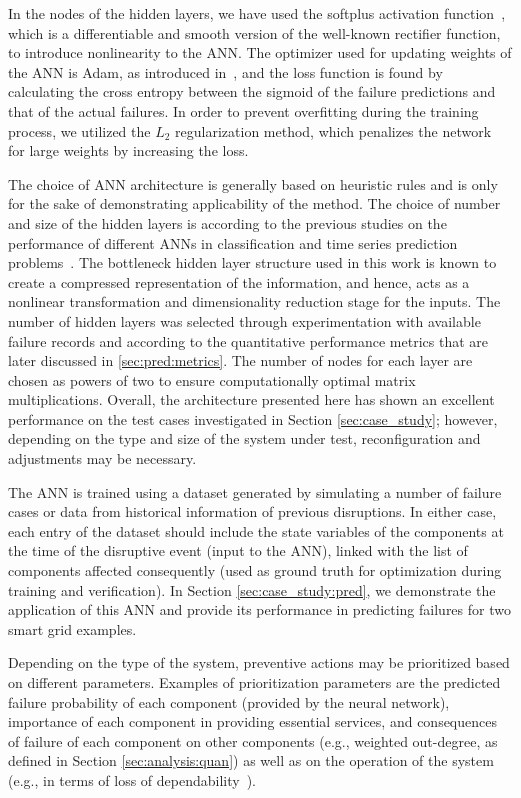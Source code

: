 \documentclass[12pt]{elsarticle}
\begin{document}
In the nodes of the hidden layers, we have used the softplus activation function~\cite{DuB00}, which is a differentiable and smooth version of the well-known rectifier function, to introduce nonlinearity to the ANN. The optimizer used for updating weights of the ANN is Adam, as introduced in~\cite{KiB15}, and the loss function is found by calculating the cross entropy between the sigmoid of the failure predictions and that of the actual failures. In order to prevent overfitting during the training process, we utilized the $L_2$ regularization method, which penalizes the network for large weights by increasing the loss.

The choice of ANN architecture is generally based on heuristic rules and is only for the sake of demonstrating applicability of the method. The choice of number and size of the hidden layers is according to the previous studies on the performance of different ANNs in classification and time series prediction problems~\cite{YuS11}. The bottleneck hidden layer structure used in this work is known to create a compressed representation of the information, and hence, acts as a nonlinear transformation and dimensionality reduction stage for the inputs. The number of hidden layers was selected through experimentation with available failure records and according to the quantitative performance metrics that are later discussed in \ref{sec:pred:metrics}. The number of nodes for each layer are chosen as powers of two to ensure computationally optimal matrix multiplications. Overall, the architecture presented here has shown an excellent performance on the test cases investigated in Section \ref{sec:case_study}; however, depending on the type and size of the system under test, reconfiguration and adjustments may be necessary.

The ANN is trained using a dataset generated by simulating a number of failure cases or data from historical information of previous disruptions. In either case, each entry of the dataset should include the state variables of the components at the time of the disruptive event (input to the ANN), linked with the list of components affected consequently (used as ground truth for optimization during training and verification). In Section \ref{sec:case_study:pred}, we demonstrate the application of this ANN and provide its performance in predicting failures for two smart grid examples.

Depending on the type of the system, preventive actions may be prioritized based on different parameters. Examples of prioritization parameters are the predicted failure probability of each component (provided by the neural network), importance of each component in providing essential services, and consequences of failure of each component on other components (e.g., weighted out-degree, as defined in Section \ref{sec:analysis:quan}) as well as on the operation of the system (e.g., in terms of loss of dependability~\cite{WoM20}).
\end{document}
